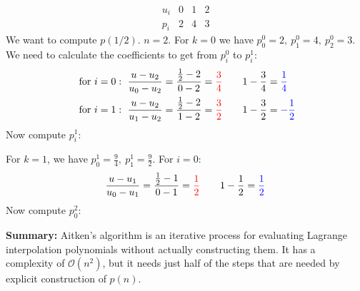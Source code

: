 \begin{example}
    \[ \begin{array}{c|c|c|c}
        u_i & 0 & 1 & 2\\
        \hline
        p_i & 2 & 4 & 3
    \end{array} \]
    We want to compute $p(1 / 2)$. $n = 2$.
    For $k=0$ we have
    $p_0^0 = 2,\ p_1^0 = 4,\ p_2^0 = 3$. We need to calculate the coefficients to get
    from $p_i^0$ to $p_i^1$:
    \begin{align*}
        \text{for } i = 0:\
        \frac{u - u_2}{u_0 - u_2} = \frac{\frac{1}{2} - 2}{0 - 2} = \textcolor{red}{\frac{3}{4}}
        \qquad&
        1 - \frac{3}{4} = \textcolor{blue}{\frac{1}{4}}
        \\
        \text{ for } i = 1:\
        \frac{u - u_2}{u_1 - u_2} = \frac{\frac{1}{2} - 2}{1 - 2} = \textcolor{red}{\frac{3}{2}}
        \qquad&
        1 - \frac{3}{2} = \textcolor{blue}{-\frac{1}{2}}
    \end{align*}
    Now compute $p_i^1$:
    \begin{center}
    \end{center}
    For $k=1$, we have
    $p_0^1 = \frac{9}{4},\ p_1^1 = \frac{9}{2}$.
    For $i = 0$:
    \[
        \frac{u - u_1}{u_0 - u_1} = \frac{\frac{1}{2} - 1}{0 - 1} = \textcolor{red}{\frac{1}{2}}
        \qquad
        1 - \frac{1}{2} = \textcolor{blue}{\frac{1}{2}}
    \]
    Now compute $p_0^2$:
    \begin{center}
    \end{center}
\end{example}

\textbf{Summary:} Aitken's algorithm is an iterative process
for evaluating Lagrange interpolation polynomials without actually constructing
them. It has a complexity of $\mathcal{O}(n^2)$, but it needs
just half of the steps that are needed by explicit construction of $p(n)$.